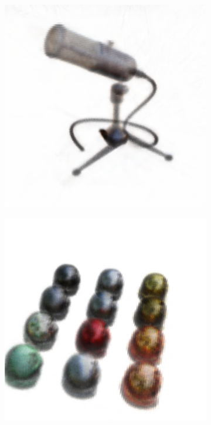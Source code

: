 \documentclass{article}
\begin{document}
\begin{figure}[!h]
\begin{subfigure}{.24\textwidth}
  \centering
  \includegraphics[width=\linewidth]{figs/results/mic.png}  
\end{subfigure}
\begin{subfigure}{.24\textwidth}
  \centering
  \includegraphics[width=\linewidth]{figs/results/materials.png}  

\end{subfigure}
\end{figure}
\end{document}
